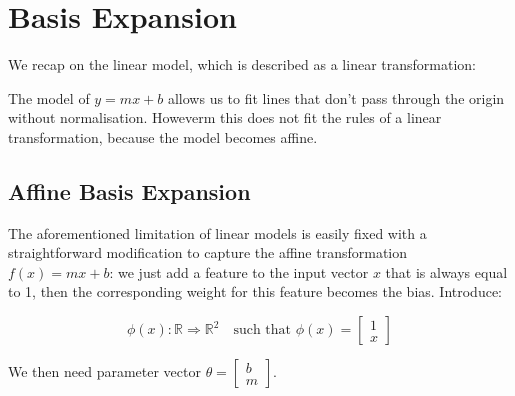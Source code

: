 \newpage
\section{Basis Expansion}
We recap on the linear model, which is described as a linear transformation:


The model of $y=mx+b$ allows us to fit lines that don't pass through the origin without normalisation. Howeverm this does not fit the rules of a linear transformation, because the model becomes affine.


\subsection{Affine Basis Expansion}
The aforementioned limitation of linear models is easily fixed with a straightforward modification to capture the affine transformation $f(x) = mx + b$: we just add a feature to the input vector $x$ that is always equal to 1, then the corresponding weight for this feature becomes the bias. Introduce:

\begin{equation}
    \phi(x) : \mathbb{R} \Rightarrow \mathbb{R}^2 \quad \text{such that } \phi(x) = \begin{bmatrix} 1 \\ x \end{bmatrix}
\end{equation}

\noindent We then need parameter vector $\theta = \begin{bmatrix} b \\ m \end{bmatrix}$.

